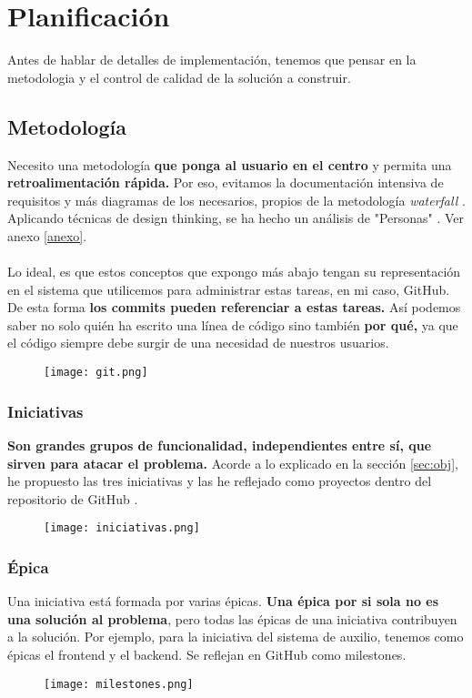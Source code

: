 \chapter{Planificación}

Antes de hablar de detalles de implementación, tenemos que pensar en la metodologia y el control de calidad de la solución a construir.

\section{Metodología}

Necesito una metodología \textbf{que ponga al usuario en el centro} y permita una \textbf{retroalimentación rápida.} Por eso, evitamos la documentación intensiva de requisitos y más diagramas de los necesarios, propios de la metodología \textit{waterfall} \cite{waterfall}.\\
Aplicando técnicas de design thinking, se ha hecho un análisis de "Personas" \cite{personas}. Ver anexo \ref{anexo}.
\\\\
Lo ideal, es que estos conceptos que expongo más abajo tengan su representación en el sistema que utilicemos
para administrar estas tareas, en mi caso, GitHub. 
De esta forma \textbf{los commits pueden referenciar a estas tareas.} Así podemos
saber no solo quién ha escrito una línea de código sino también \textbf{por qué,} ya que el código siempre debe surgir de una necesidad de nuestros usuarios. 
\begin{figure}[H]
\centering	
\texttt{[image: git.png]}
\end{figure}
\subsection{Iniciativas}
\textbf{Son grandes grupos de funcionalidad, independientes entre sí, que sirven para atacar el problema.}
Acorde a lo explicado en la sección \ref{sec:obj}, he propuesto las tres iniciativas y las he 
reflejado como proyectos dentro del repositorio de GitHub \cite{repo}.
\begin{figure}[H]
\centering	
\texttt{[image: iniciativas.png]}
\end{figure}

\subsection{Épica}
Una iniciativa está formada por varias épicas. \textbf{Una épica por si sola no es una solución al problema}, pero todas las épicas de una iniciativa contribuyen a la solución.
Por ejemplo, para la iniciativa del sistema de auxilio, tenemos 
como épicas el frontend y el backend. Se reflejan en GitHub como milestones.
\begin{figure}[H]
	\centering
\texttt{[image: milestones.png]}
\end{figure}


